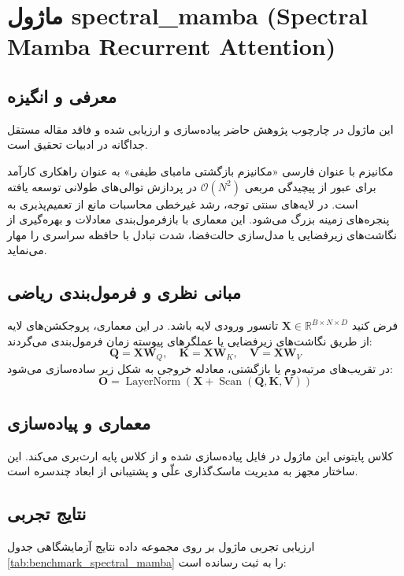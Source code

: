 \section{ماژول spectral\_mamba (Spectral Mamba Recurrent Attention)}
\label{sec:module_spectral_mamba}

\subsection{معرفی و انگیزه}
این ماژول در چارچوب پژوهش حاضر پیاده‌سازی و ارزیابی شده و فاقد مقاله مستقل جداگانه در ادبیات تحقیق است.

مکانیزم  با عنوان فارسی «مکانیزم بازگشتی مامبای طیفی» به عنوان راهکاری کارآمد برای عبور از پیچیدگی مربعی $\mathcal{O}(N^2)$ در پردازش توالی‌های طولانی توسعه یافته است. در لایه‌های سنتی توجه، رشد غیرخطی محاسبات مانع از تعمیم‌پذیری به پنجره‌های زمینه بزرگ می‌شود. این معماری با بازفرمول‌بندی معادلات و بهره‌گیری از نگاشت‌های زیرفضایی یا مدل‌سازی حالت‌فضا، شدت تبادل با حافظه سراسری را مهار می‌نماید.

\subsection{مبانی نظری و فرمول‌بندی ریاضی}
فرض کنید $\mathbf{X} \in \mathbb{R}^{B \times N \times D}$ تانسور ورودی لایه باشد. در این معماری، پروجکشن‌های لایه از طریق نگاشت‌های زیرفضایی یا عملگرهای پیوسته زمان فرمول‌بندی می‌گردند:
 \begin{equation}
\mathbf{Q} = \mathbf{X} \mathbf{W}_Q, \quad \mathbf{K} = \mathbf{X} \mathbf{W}_K, \quad \mathbf{V} = \mathbf{X} \mathbf{W}_V
\end{equation}
در تقریب‌های مرتبه‌دوم یا بازگشتی، معادله خروجی به شکل زیر ساده‌سازی می‌شود:
 \begin{equation}
\mathbf{O} = \operatorname{LayerNorm}\left(\mathbf{X} + \operatorname{Scan}(\mathbf{Q}, \mathbf{K}, \mathbf{V})
\right)
\end{equation}

\subsection{معماری و پیاده‌سازی}
کلاس پایتونی این ماژول در فایل  پیاده‌سازی شده و از کلاس پایه  ارث‌بری می‌کند. این ساختار مجهز به مدیریت ماسک‌گذاری علّی و پشتیبانی از ابعاد چندسره است.

\subsection{نتایج تجربی}
ارزیابی تجربی ماژول  بر روی مجموعه داده  نتایج آزمایشگاهی جدول 
\ref{tab:benchmark_spectral_mamba} را به ثبت رسانده است:

